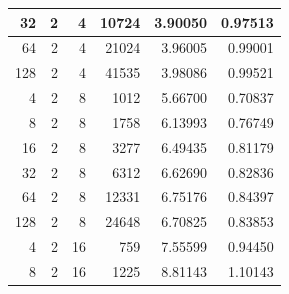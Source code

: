 \documentclass[journal,transmag]{IEEEtran}
\begin{document}
\begin{table}[h]
\begin{tabular}{|r|r|r|r|r|r|}
		32                            & 2                          & 4                                & 10724                          & 3.90050                       & 0.97513                         \\ \hline
		64                            & 2                          & 4                                & 21024                          & 3.96005                       & 0.99001                         \\ \hline
		128                           & 2                          & 4                                & 41535                          & 3.98086                       & 0.99521                         \\ \hline
		4                             & 2                          & 8                                & 1012                           & 5.66700                       & 0.70837                         \\ \hline
		8                             & 2                          & 8                                & 1758                           & 6.13993                       & 0.76749                         \\ \hline
		16                            & 2                          & 8                                & 3277                           & 6.49435                       & 0.81179                         \\ \hline
		32                            & 2                          & 8                                & 6312                           & 6.62690                       & 0.82836                         \\ \hline
		64                            & 2                          & 8                                & 12331                          & 6.75176                       & 0.84397                         \\ \hline
		128                           & 2                          & 8                                & 24648                          & 6.70825                       & 0.83853                         \\ \hline
		4                             & 2                          & 16                               & 759                            & 7.55599                       & 0.94450                         \\ \hline
		8                             & 2                          & 16                               & 1225                           & 8.81143                       & 1.10143                         \\ \hline

\end{tabular}
\end{table}
\end{document}
